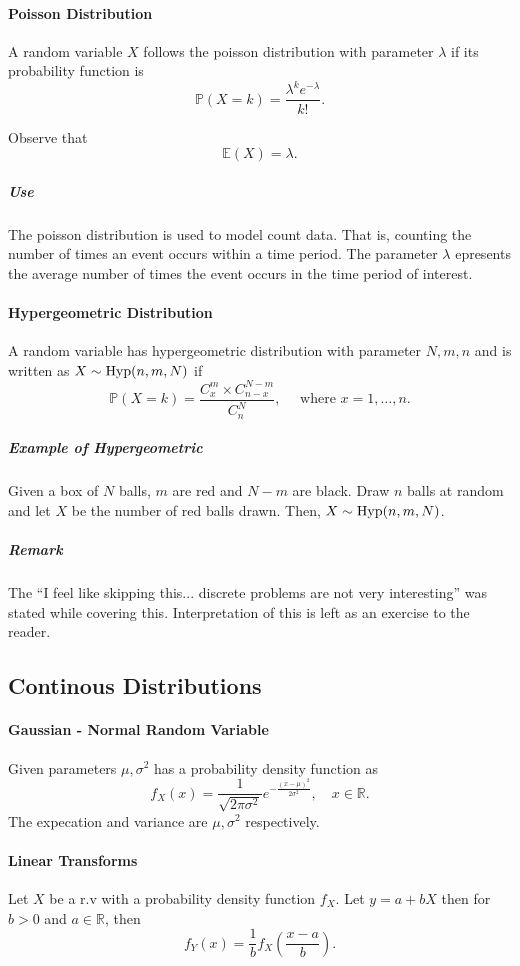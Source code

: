 \paragraph{Poisson Distribution}
A random variable \(X\) follows the poisson distribution
with parameter \(\lambda\) if its probability function is
\[
    \mathbb{P}(X = k)
    = \frac{\lambda^k e^{-\lambda}}{k!}.
\]

Observe that
\[
    \mathbb{E}(X) = \lambda.
\]

\subparagraph{Use} The poisson distribution is used to model
count data. That is, counting the number of times
an event occurs within a time period.
The parameter \(\lambda\) epresents the average number of times
the event occurs in the time period of interest.



\paragraph{Hypergeometric Distribution}
A random variable has hypergeometric distribution with
parameter \(N, m, n\) and is written as
\(X\sim \mathrm{Hyp}(n,m, N)\) if
\[
    \mathbb{P}(X = k)
    =
    \frac{C_x^m \times C^{N-m}_{n-x}}{C^N_n},
    \quad
    \text{ where } x = 1,\dots, n.
\]
\subparagraph{Example of Hypergeometric}
Given a box of \(N\) balls, \(m\) are red and
\(N - m\) are black. Draw \(n\) balls at random and let
\(X\) be the number of red balls drawn. Then, \(X \sim \mathrm{Hyp}(n, m, N)\).

\subparagraph{Remark}
The ``I feel like skipping this... discrete problems are not very interesting''
was stated while covering this. Interpretation of this
is left as an exercise to the reader.


\subsection{Continous Distributions}

\paragraph{Gaussian - Normal Random Variable}
Given parameters \(\mu, \sigma^2\) has a probability density
function as
\[
    f_X(x)
    =
    \dfrac{1}{\sqrt{2\pi\sigma^2}}
    e^{-\frac{(x-\mu)^2}{2\sigma^2}},
    \quad
    x\in \mathbb{R}.
\]
The expecation and variance are \(\mu, \sigma^2\)
respectively.

\paragraph{Linear Transforms}
Let \(X\) be a r.v with a probability
density function \(f_X\). Let
\(y = a + bX\) then for \(b > 0\) and \(a\in\mathbb{R}\),
then \[
    f_Y(x) = \frac{1}{b}f_X \left(
        \frac{x-a}{b}
    \right).
\]


